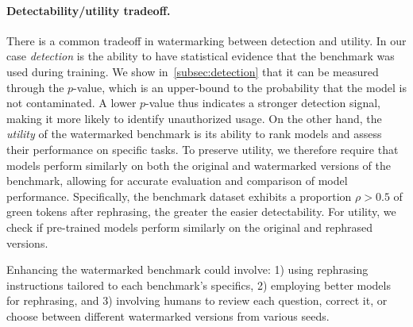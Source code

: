 
\paragraph{\textbf{Detectability/utility tradeoff.}}
There is a common tradeoff in watermarking between detection and utility.
In our case \emph{detection} is the ability to have statistical evidence that the benchmark was used during training.
We show in~\autoref{subsec:detection} that it can be measured through the $p$-value, which is an upper-bound to the probability that the model is not contaminated.
A lower $p$-value thus indicates a stronger detection signal, making it more likely to identify unauthorized usage.
On the other hand, the \emph{utility} of the watermarked benchmark is its ability to rank models and assess their performance on specific tasks. 
To preserve utility, we therefore require that models perform similarly on both the original and watermarked versions of the benchmark, allowing for accurate evaluation and comparison of model performance.
Specifically, the benchmark dataset exhibits a proportion $\rho > 0.5$ of green tokens after rephrasing, the greater the easier detectability.
For utility, we check if pre-trained models perform similarly on the original and rephrased versions. 


Enhancing the watermarked benchmark could involve: 1) using rephrasing instructions tailored to each benchmark's specifics, 2) employing better models for rephrasing, and 3) involving humans to review each question, correct it, or choose between different watermarked versions from various seeds. 

